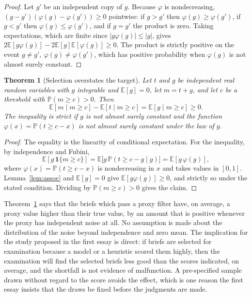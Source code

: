 \documentclass[11pt]{article}
\theoremstyle{plain}
\newtheorem{theorem}{Theorem}[section]
\theoremstyle{definition}
\theoremstyle{remark}
\newcommand{\E}{\mathbb{E}}
\renewcommand{\Pr}{\mathbb{P}}
\begin{document}
\begin{proof}
Let $g'$ be an independent copy of $g$. Because $\varphi$ is nondecreasing, $(g-g')(\varphi(g)-\varphi(g'))\ge0$ pointwise: if $g>g'$ then $\varphi(g)\ge\varphi(g')$, if $g<g'$ then $\varphi(g)\le\varphi(g')$, and if $g=g'$ the product is zero. Taking expectations, which are finite since $|g\varphi(g)|\le|g|$, gives $2\E[g\varphi(g)]-2\E[g]\E[\varphi(g)]\ge0$. The product is strictly positive on the event $g\ne g',\ \varphi(g)\ne\varphi(g')$, which has positive probability when $\varphi(g)$ is not almost surely constant. \qedhere
\end{proof}

\begin{theorem}[Selection overstates the target]\label{thm:regress}
Let $t$ and $g$ be independent real random variables with $g$ integrable and $\E[g]=0$, let $m=t+g$, and let $c$ be a threshold with $\Pr(m\ge c)>0$. Then
\[
\E[m\mid m\ge c]-\E[t\mid m\ge c]=\E[g\mid m\ge c]\ge0.
\]
The inequality is strict if $g$ is not almost surely constant and the function $\varphi(x)=\Pr(t\ge c-x)$ is not almost surely constant under the law of $g$.
\end{theorem}

\begin{proof}
The equality is the linearity of conditional expectation. For the inequality, by independence and Fubini,
\[
\E[g\,\mathbf 1\{m\ge c\}]=\E\bigl[g\,\Pr(t\ge c-g\mid g)\bigr]=\E[g\,\varphi(g)],
\]
where $\varphi(x)=\Pr(t\ge c-x)$ is nondecreasing in $x$ and takes values in $[0,1]$. Lemma~\ref{lem:assoc} and $\E[g]=0$ give $\E[g\varphi(g)]\ge0$, and strictly so under the stated condition. Dividing by $\Pr(m\ge c)>0$ gives the claim. \qedhere
\end{proof}

Theorem~\ref{thm:regress} says that the briefs which pass a proxy filter have, on average, a proxy value higher than their true value, by an amount that is positive whenever the proxy has independent noise at all. No assumption is made about the distribution of the noise beyond independence and zero mean. The implication for the study proposed in the first essay is direct: if briefs are selected for examination because a model or a heuristic scored them highly, then the examination will find the selected briefs less good than the scores indicated, on average, and the shortfall is not evidence of malfunction. A pre-specified sample drawn without regard to the score avoids the effect, which is one reason the first essay insists that the draws be fixed before the judgments are made.
\end{document}
